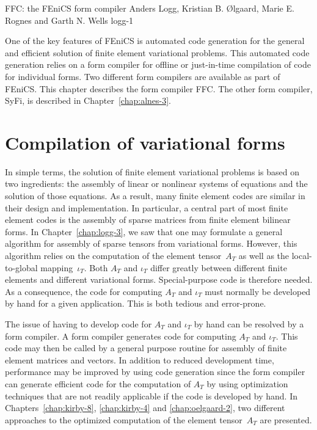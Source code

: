               {FFC: the FEniCS form compiler}
              {Anders Logg, Kristian B. \O{}lgaard, Marie E. Rognes and Garth N. Wells}
              {logg-1}


One of the key features of FEniCS is automated code generation for
the general and efficient solution of finite element variational
problems. This automated code generation relies on a form compiler for
offline or just-in-time compilation of code for individual forms. Two
different form compilers are available as part of FEniCS. This chapter
describes the form compiler FFC. The other form compiler, SyFi, is
described in Chapter~\ref{chap:alnes-3}.


\section{Compilation of variational forms}

In simple terms, the solution of finite element variational problems
is based on two ingredients: the assembly of linear or nonlinear
systems of equations and the solution of those equations. As a result,
many finite element codes are similar in their design and
implementation. In particular, a central part of most finite element
codes is the assembly of sparse matrices from finite element bilinear
forms. In Chapter~\ref{chap:logg-3}, we saw that one may formulate a
general algorithm for assembly of sparse tensors from variational
forms. However, this algorithm relies on the computation of the
element tensor~$A_T$ as well as the local-to-global mapping~$\iota_T$.
Both $A_T$ and $\iota_T$ differ greatly between different finite
elements and different variational forms. Special-purpose code is
therefore needed. As a consequence, the code for computing $A_T$ and
$\iota_T$ must normally be developed by hand for a given
application. This is both tedious and error-prone.


The issue of having to develop code for $A_T$ and $\iota_T$ by hand
can be resolved by a form compiler. A form compiler generates code for
computing $A_T$ and $\iota_T$. This code may then be called by a
general purpose routine for assembly of finite element matrices and
vectors. In addition to reduced development time, performance may be
improved by using code generation since the form compiler can generate
efficient code for the computation of $A_T$ by using optimization
techniques that are not readily applicable if the code is developed by
hand. In Chapters~\ref{chap:kirby-8}, \ref{chap:kirby-4} and
\ref{chap:oelgaard-2}, two different approaches to the optimized
computation of the element tensor~$A_T$ are presented.

